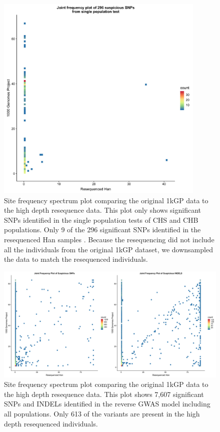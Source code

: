 \documentclass[9pt,lineno]{elife}
\begin{document}
\begin{figure}[h]
\centering
\includegraphics[width=10cm,keepaspectratio]{./Figures/Han_1kGP_SFS_singlePop.jpg}
\caption{Site frequency spectrum plot comparing the original 1kGP data to the high depth resequence data. This plot only shows significant SNPs identified in the single population tests of CHS and CHB populations. Only 9 of the 296 significant SNPs identified in the resequenced Han samples \citep{Lan2017}.
Because the resequencing did not include all the individuals from the original 1kGP dataset, we downsampled the data to match the resequenced individuals.}  
\label{90HanSFS}
\end{figure}

\begin{figure}[h]
\centering
\includegraphics[width=15cm,keepaspectratio]{./Figures/Han_1kGP_SFS.jpg}
\caption{Site frequency spectrum plot comparing the original 1kGP data to the high depth resequence data. This plot shows  7,607 significant SNPs and INDELs identified in the reverse GWAS model including all populations. Only 613 of the variants are present in the high depth resequenced individuals.}  
\label{90HanSFS_full}
\end{figure}
\end{document}

